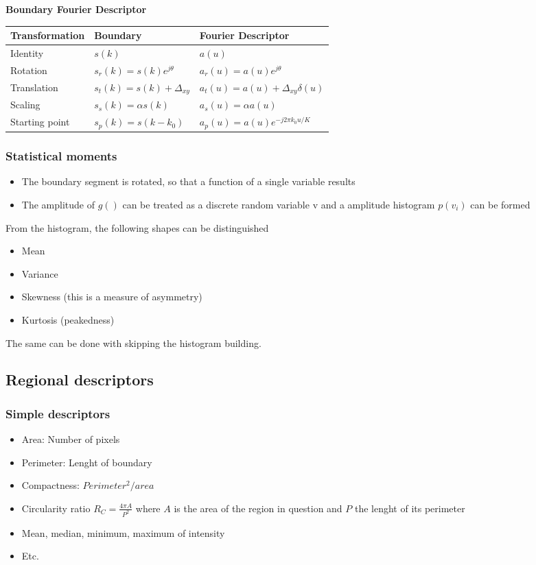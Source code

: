 \textbf{Boundary Fourier Descriptor}

\begin{tabularx}{\textwidth}{XXX}
Transformation & Boundary & Fourier Descriptor \\\hline
Identity & $s(k)$ & $a(u)$ \\
Rotation & $s_r(k)=s(k)e^{j\theta}$& $a_r(u)=a(u)e^{j\theta}$ \\
Translation &$s_t(k)=s(k)+\Delta_{xy}$& $a_t(u)=a(u)+\Delta_{xy}\delta(u)$ \\
Scaling &$s_s(k)=\alpha s(k)$& $a_s(u)=\alpha a(u)$ \\
Starting point & $s_p(k)=s(k-k_0)$& $a_p(u)=a(u)e^{-j2\pi k_0u/K}$ \\
\end{tabularx}

\subsubsection{Statistical moments}
\begin{itemize}
\item The boundary segment is rotated, so that a function of a single variable results
\item The amplitude of $g()$ can be treated as a discrete random variable v and a amplitude histogram $p(v_i)$ can be formed
\end{itemize}
From the histogram, the following shapes can be distinguished
\begin{itemize}
\item Mean
\item Variance
\item Skewness (this is a measure of asymmetry)
\item Kurtosis (peakedness)
\end{itemize}
The same can be done with skipping the histogram building.

\subsection{Regional descriptors}
\subsubsection{Simple descriptors}
\begin{itemize}
\item Area: Number of pixels
\item Perimeter: Lenght of boundary
\item Compactness: $Perimeter^2/area$
\item Circularity ratio $R_C=\frac{4\pi A}{P^2}$ where $A$ is the area of the region in question and $P$ the lenght of its perimeter
\item Mean, median, minimum, maximum of intensity
\item Etc.
\end{itemize}
